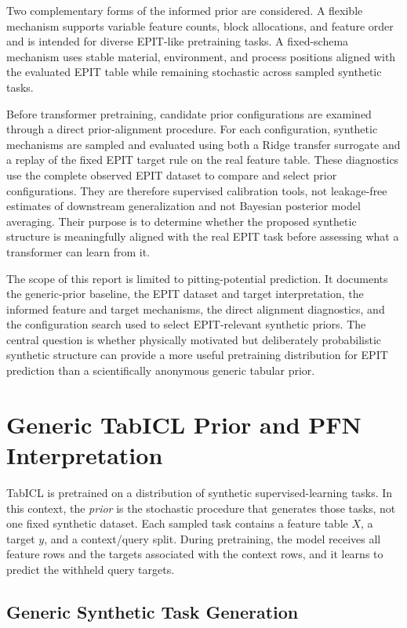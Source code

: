 \documentclass{article}
\begin{document}
Two complementary forms of the informed prior are considered. A flexible mechanism supports variable feature counts, block allocations, and feature order and is intended for diverse EPIT-like pretraining tasks. A fixed-schema mechanism uses stable material, environment, and process positions aligned with the evaluated EPIT table while remaining stochastic across sampled synthetic tasks.

Before transformer pretraining, candidate prior configurations are examined through a direct prior-alignment procedure. For each configuration, synthetic mechanisms are sampled and evaluated using both a Ridge transfer surrogate and a replay of the fixed EPIT target rule on the real feature table. These diagnostics use the complete observed EPIT dataset to compare and select prior configurations. They are therefore supervised calibration tools, not leakage-free estimates of downstream generalization and not Bayesian posterior model averaging. Their purpose is to determine whether the proposed synthetic structure is meaningfully aligned with the real EPIT task before assessing what a transformer can learn from it.

The scope of this report is limited to pitting-potential prediction. It documents the generic-prior baseline, the EPIT dataset and target interpretation, the informed feature and target mechanisms, the direct alignment diagnostics, and the configuration search used to select EPIT-relevant synthetic priors. The central question is whether physically motivated but deliberately probabilistic synthetic structure can provide a more useful pretraining distribution for EPIT prediction than a scientifically anonymous generic tabular prior.

\section{Generic TabICL Prior and PFN Interpretation}
\label{sec:generic-prior}

TabICL is pretrained on a distribution of synthetic supervised-learning tasks. In this context, the \emph{prior} is the stochastic procedure that generates those tasks, not one fixed synthetic dataset. Each sampled task contains a feature table \(X\), a target \(y\), and a context/query split. During pretraining, the model receives all feature rows and the targets associated with the context rows, and it learns to predict the withheld query targets.

\subsection{Generic Synthetic Task Generation}
\end{document}
